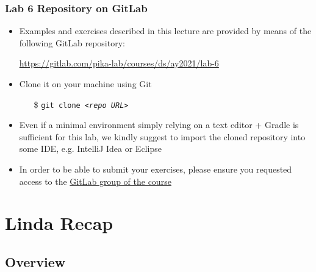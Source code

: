 \documentclass[presentation]{beamer}\mode<presentation>{\usetheme{AMSCesenaPurpleAndGold}}
\newcommand{\labN}{6}
\newcommand{\labGroup}{https://gitlab.com/pika-lab/courses/ds/ay2021}
\newcommand{\labRepo}{\labGroup/lab-\labN}
\begin{document}
\begin{frame}
	\frametitle{Lab \labN{} Repository on GitLab}
	
	\begin{itemize}
		\item Examples and exercises described in this lecture are provided by means of the following GitLab repository:
		\begin{center}
			\url{\labRepo}
		\end{center}
		
		\vfill
		
		\item Clone it on your machine using Git
		\begin{itemize}
		    \item[\$] \texttt{git clone \textit{<repo URL>}}
		\end{itemize}
		
		\vfill
		
		\item Even if a minimal environment simply relying on a text editor + Gradle is sufficient for this lab, we kindly suggest to import the cloned repository into some IDE, e.g. IntelliJ Idea or Eclipse
		
		\vfill
		
		\item In order to be able to submit your exercises, please ensure you requested access to the \href{\labGroup}{GitLab group of the course}
	\end{itemize}

\end{frame}

\section{Linda Recap}

\subsection{Overview} 
\end{document}
